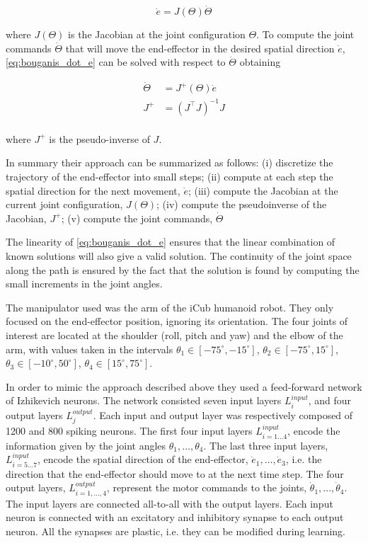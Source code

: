 \documentclass[10pt,a4paper, final]{report} %
\begin{document}
\begin{equation}
\dot{e} = J(\Theta) \dot{\Theta}
\label{eq:bouganis_dot_e}
\end{equation} 

where $J(\Theta)$ is the Jacobian at the joint configuration $\Theta$. To compute the joint commands $\dot{\Theta}$ that will move the end-effector in the desired spatial direction $\dot{e}$, \eqref{eq:bouganis_dot_e} can be solved with respect to $\dot{\Theta}$ obtaining

\begin{align}
\dot{\Theta} &= J^+(\Theta) \dot{e}\label{eq:bouganis_dot_theta}\\
J^+ &= (J^\intercal J)^{-1} J \\
\end{align}

where $J^+$ is the pseudo-inverse of $J$.

In summary their approach can be summarized as follows:
(i) discretize the trajectory of the end-effector into small steps;
(ii) compute at each step the spatial direction for the next movement, $\dot{e}$;
(iii) compute the Jacobian at the current joint configuration, $J(\Theta)$;
(iv) compute the pseudoinverse of the Jacobian, $J^+$;
(v) compute the joint commands, $\dot{\Theta}$

The linearity of \eqref{eq:bouganis_dot_e} ensures that the linear combination of known solutions will also give a valid solution. The continuity of the joint space along the path is ensured by the fact that the solution is found by computing the small increments in the joint angles.

The manipulator used was the arm of the iCub humanoid robot. They only focused on the end-effector position, ignoring its orientation. The four joints of interest are located at
the shoulder (roll, pitch and yaw) and the elbow of the arm, with values taken in the intervals $\theta_1 \in [-75^\circ, -15^\circ]$, $\theta_2 \in [-75^\circ, 15^\circ]$, $\theta_3 \in [-10^\circ, 50^\circ]$, $\theta_4 \in [15^\circ, 75^\circ]$.

In order to mimic the approach described above they used a feed-forward network of Izhikevich neurons. The network consisted seven input layers $L^{input}_i$, and four output layers $L^{output}_j$. Each input and output layer was respectively composed of 1200 and 800 spiking neurons. 
The first four input layers $L^{input}_{i=1 \ldots 4}$, encode the information given by the joint angles $\theta_1, \ldots, \theta_4$. The last three input layers, $L^{input}_{i=5 \ldots 7}$, encode the spatial direction of the end-effector, $\dot{e}_1, \ldots, \dot{e}_3$, i.e. the direction that the end-effector should move to at the next time step. The four output layers, $L^{output}_{i=1, \ldots, 4}$, represent the motor commands to the joints, $\dot{\theta}_1, \ldots, \dot{\theta}_4$.
The input layers are connected all-to-all with the output layers. Each input neuron is connected with an excitatory and inhibitory synapse to each output neuron. All the synapses are plastic, i.e. they can be modified during learning.
\end{document}
